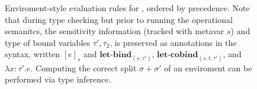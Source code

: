 \begin{figure}
\begin{Small}
\begin{center}
\end{center}
    \caption{Enviroment-style evaluation rules for \Lang, ordered by precedence.
    Note that during type checking but prior to running the operational
    semanitcs, the sensitivity information (tracked with metavar $s$) and type
    of bound variables $\tau', \tau_2$, is preserved as annotations in the
    syntax, written $[e]_s$ and $\textbf{let-bind}_{(s, \tau')}$,
    $\textbf{let-cobind}_{(s, t, \tau')}$, and $\lambda x : \tau' . e $.
    Computing the correct split $\sigma + \sigma'$ of an enviroment can be
    performed via type inference.
    }
    \label{fig:sub_eval_rules}
\end{Small}
\end{figure}
